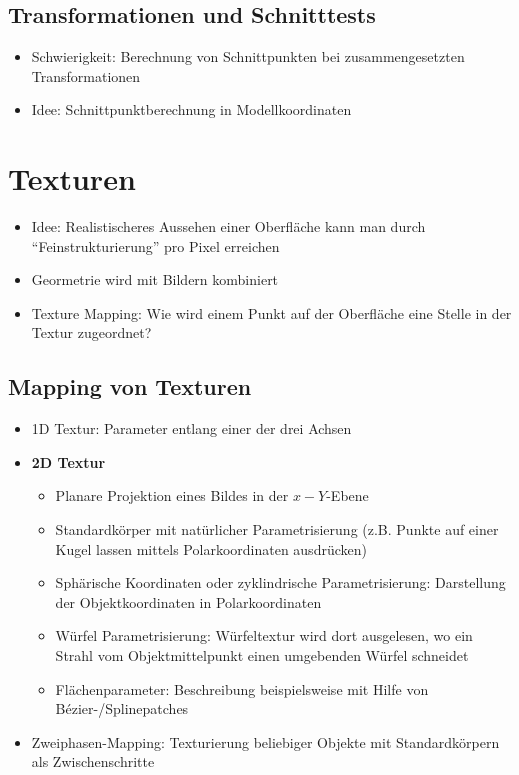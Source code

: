 \subsection{Transformationen und Schnitttests}
\begin{itemize}
	\item Schwierigkeit: Berechnung von Schnittpunkten bei zusammengesetzten Transformationen
	\item Idee: Schnittpunktberechnung in Modellkoordinaten
\end{itemize}



\section{Texturen}
\begin{itemize}
	\item Idee: Realistischeres Aussehen einer Oberfläche kann man durch "`Feinstrukturierung"' pro Pixel erreichen
	\item Geormetrie wird mit Bildern kombiniert
	\item Texture Mapping: Wie wird einem Punkt auf der Oberfläche eine Stelle in der Textur zugeordnet?
\end{itemize}


\subsection{Mapping von Texturen}
\begin{itemize}
	\item 1D Textur: Parameter entlang einer der drei Achsen
	\item \textbf{2D Textur}
	\begin{itemize}
		\item Planare Projektion eines Bildes in der \(x-Y\)-Ebene
		\item Standardkörper mit natürlicher Parametrisierung (z.B. Punkte auf einer Kugel lassen mittels Polarkoordinaten ausdrücken)
		\item Sphärische Koordinaten oder zyklindrische Parametrisierung: Darstellung der Objektkoordinaten in Polarkoordinaten
		\item Würfel Parametrisierung: Würfeltextur wird dort ausgelesen, wo ein Strahl vom Objektmittelpunkt einen umgebenden Würfel schneidet
		\item Flächenparameter: Beschreibung beispielsweise mit Hilfe von Bézier-/Splinepatches
	\end{itemize}
	\item Zweiphasen-Mapping: Texturierung beliebiger Objekte mit Standardkörpern als Zwischenschritte
\end{itemize}

